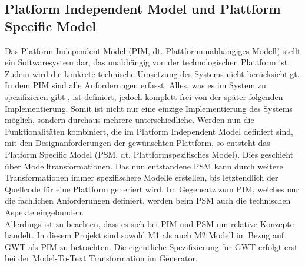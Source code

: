\subsection{Platform Independent Model und Plattform Specific Model} \label{PIMPSM}
Das Platform Independent Model (PIM, dt. Plattformunabhängiges Modell) stellt ein
Softwaresystem dar, das unabhängig von der technologischen Plattform ist. Zudem wird die konkrete technische Umsetzung des Systems nicht berücksichtigt. In dem PIM
sind alle Anforderungen erfasst. Alles, was es im System zu spezifizieren gibt , ist definiert,
jedoch komplett frei von der später folgenden Implementierung. Somit ist nicht nur eine
einzige Implementierung des Systems möglich, sondern durchaus mehrere
unterschiedliche.
Werden nun die Funktionalitäten kombiniert, die im Platform Independent Model definiert sind, mit den Designanforderungen der gewünschten Plattform, so entsteht das Platform Specific Model (PSM, dt. Plattformspezifisches Model). Dies geschieht über Modelltransformationen. Das nun entstandene PSM kann durch weitere Transformationen immer spezifischere Modelle erstellen, bis letztendlich der Quellcode für eine Plattform generiert wird. Im Gegensatz zum PIM, welches nur die
fachlichen Anforderungen definiert, werden beim PSM auch die technischen Aspekte
eingebunden.\cite[S.377 ff.]{bib:MDA2}\cite{bib:MDA3}\\ 
 
Allerdings ist zu beachten, dass es sich bei PIM und PSM um relative Konzepte handelt. 
In diesem Projekt sind sowohl M1 als auch M2 Modell im Bezug auf GWT als PIM zu betrachten. Die eigentliche Spezifizierung für GWT erfolgt erst bei der Model-To-Text Transformation im Generator.